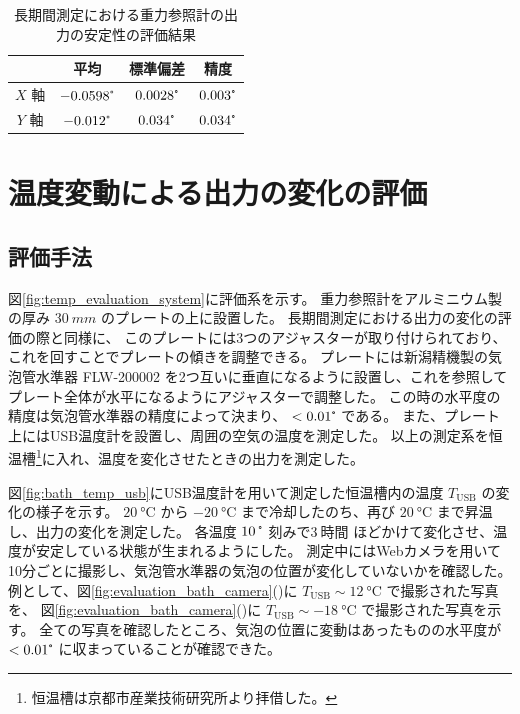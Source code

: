 \documentclass[../../main.tex]{subfiles}
\begin{document}
\begin{table}[H]
    \centering
    \caption{長期間測定における重力参照計の出力の安定性の評価結果}
    \begin{tabular}{cccc} \hline
        & 平均 & 標準偏差 & 精度 \\ \hline\hline
        $X$ 軸 & $-0.0598\tcdegree$ & $0.0028\tcdegree$ & $0.003\tcdegree$ \\ \hline
        $Y$ 軸 & $-0.012\tcdegree$ & $0.034\tcdegree$ & $0.034\tcdegree$ \\ \hline
    \end{tabular}
    \label{tab:timedrift_result}
\end{table}

\section{温度変動による出力の変化の評価}
\subsection{評価手法}
図\ref{fig:temp_evaluation_system}に評価系を示す。
重力参照計をアルミニウム製の厚み $\SI{30}{mm}$ のプレートの上に設置した。
長期間測定における出力の変化の評価の際と同様に、
このプレートには3つのアジャスターが取り付けられており、これを回すことでプレートの傾きを調整できる。
プレートには新潟精機製の気泡管水準器 FLW-200002 を2つ互いに垂直になるように設置し、これを参照して
プレート全体が水平になるようにアジャスターで調整した。
この時の水平度の精度は気泡管水準器の精度によって決まり、 $< 0.01\tcdegree$ である。
また、プレート上にはUSB温度計を設置し、周囲の空気の温度を測定した。
以上の測定系を恒温槽\footnote{恒温槽は京都市産業技術研究所より拝借した。}に入れ、温度を変化させたときの出力を測定した。

図\ref{fig:bath_temp_usb}にUSB温度計を用いて測定した恒温槽内の温度 $T_{\mathrm{USB}}$ の変化の様子を示す。
$\SI{20}{\degreeCelsius}$ から $\SI{-20}{\degreeCelsius}$ まで冷却したのち、再び $\SI{20}{\degreeCelsius}$ まで昇温し、出力の変化を測定した。
各温度 $\SI{10}{\tcdegree}$ 刻みで$\SI{3}{時間}$ ほどかけて変化させ、温度が安定している状態が生まれるようにした。
測定中にはWebカメラを用いて10分ごとに撮影し、気泡管水準器の気泡の位置が変化していないかを確認した。
例として、図\ref{fig:evaluation_bath_camera}()に
$T_{\mathrm{USB}} \sim \SI{12}{\degreeCelsius}$ で撮影された写真を、
図\ref{fig:evaluation_bath_camera}()に
$T_{\mathrm{USB}} \sim \SI{-18}{\degreeCelsius}$ で撮影された写真を示す。
全ての写真を確認したところ、気泡の位置に変動はあったものの水平度が $< 0.01\tcdegree$ に収まっていることが確認できた。
\end{document}
